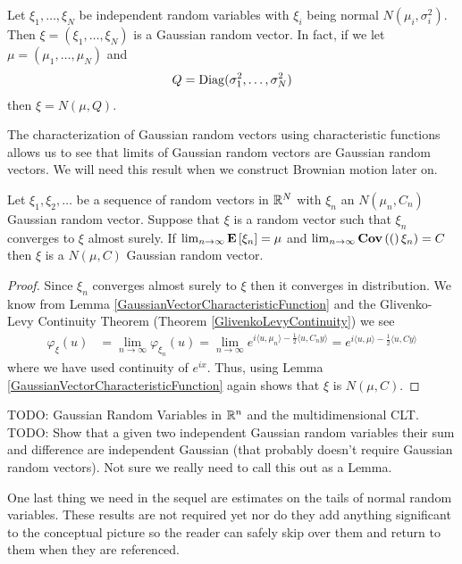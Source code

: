 \begin{examp}Let $\xi_1, \dots, \xi_N$ be independent random variables
  with $\xi_i$ being normal $N(\mu_i, \sigma_i^2)$.  Then $\xi =
  (\xi_1, \dots, \xi_N)$ is a Gaussian random vector.  In fact, if we
  let $\mu = (\mu_1, \dots, \mu_N)$ and 
\begin{align*}
Q = \operatorname*{Diag}(\sigma_1^2, \dots, \sigma_N^2)
\end{align*}
then $\xi = N(\mu, Q)$.
\end{examp}

The characterization of Gaussian random vectors using characteristic
functions allows us to see that limits of Gaussian random vectors are
Gaussian random vectors.  We will need this result when we construct
Brownian motion later on.
\begin{lem}\label{LimitOfGaussianRandomVectors}Let $\xi_1, \xi_2, \dots$ be a sequence of random
  vectors in $\mathbb{R}^N$ with $\xi_n$ an $N(\mu_n, C_n)$ Gaussian
  random vector.  Suppose that $\xi$ is a random vector such
  that $\xi_n$ converges to $\xi$ almost surely.  If $\lim_{n \to
    \infty} \textbf{E}\left[\xi_n\right] = \mu$ and $\lim_{n \to \infty}
  \textbf{Cov} \left (( \right )\xi_n) = C$ then $\xi$ is a $N(\mu, C)$ Gaussian random vector.
\end{lem}
\begin{proof}
Since $\xi_n$ converges almost surely to $\xi$ then it converges in
distribution.  We know from Lemma
\ref{GaussianVectorCharacteristicFunction} and the Glivenko-Levy
Continuity Theorem (Theorem \ref{GlivenkoLevyContinuity}) we see
\begin{align*}
\varphi_\xi(u) &= \lim_{n \to \infty} \varphi_{\xi_n}(u) = \lim_{n \to
  \infty} e^{i\langle u, \mu_n\rangle - \frac{1}{2}\langle u, C_n
  y\rangle} = e^{i\langle u, \mu\rangle - \frac{1}{2}\langle u, C
  y\rangle} 
\end{align*}
where we have used continuity of $e^{ix}$.  Thus, using Lemma
\ref{GaussianVectorCharacteristicFunction}
again shows that $\xi$ is $N(\mu, C)$.
\end{proof}

TODO: Gaussian Random Variables in $\mathbb{R}^n$ and the multidimensional
CLT.
TODO: Show that a
given two independent Gaussian random variables their sum and
difference are independent Gaussian (that probably doesn't require
Gaussian random vectors).  Not sure we really need to call this out as a Lemma.

One last thing we need in the sequel are estimates on the tails of
normal random variables.  These results are not required yet nor do
they add anything significant to the conceptual picture so the
reader can safely skip over them and return to them when they are
referenced.

